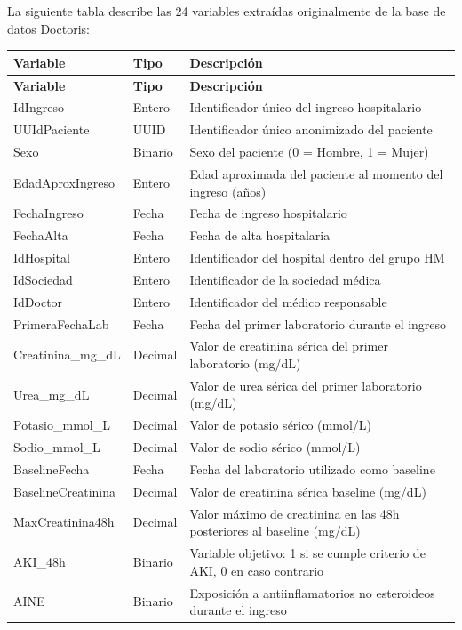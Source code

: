 \documentclass[12pt, a4paper, oneside]{report}
\begin{document}
La siguiente tabla describe las 24 variables extraídas originalmente de la base de datos Doctoris:

\begin{longtable}{p{4cm}p{2.5cm}p{7cm}}
\hline
\textbf{Variable} & \textbf{Tipo} & \textbf{Descripción} \\
\hline
\endfirsthead
\hline
\textbf{Variable} & \textbf{Tipo} & \textbf{Descripción} \\
\hline
\endhead
\hline
\endfoot
IdIngreso & Entero & Identificador único del ingreso hospitalario \\
UUIdPaciente & UUID & Identificador único anonimizado del paciente \\
Sexo & Binario & Sexo del paciente (0 = Hombre, 1 = Mujer) \\
EdadAproxIngreso & Entero & Edad aproximada del paciente al momento del ingreso (años) \\
FechaIngreso & Fecha & Fecha de ingreso hospitalario \\
FechaAlta & Fecha & Fecha de alta hospitalaria \\
IdHospital & Entero & Identificador del hospital dentro del grupo HM \\
IdSociedad & Entero & Identificador de la sociedad médica \\
IdDoctor & Entero & Identificador del médico responsable \\
PrimeraFechaLab & Fecha & Fecha del primer laboratorio durante el ingreso \\
Creatinina\_mg\_dL & Decimal & Valor de creatinina sérica del primer laboratorio (mg/dL) \\
Urea\_mg\_dL & Decimal & Valor de urea sérica del primer laboratorio (mg/dL) \\
Potasio\_mmol\_L & Decimal & Valor de potasio sérico (mmol/L) \\
Sodio\_mmol\_L & Decimal & Valor de sodio sérico (mmol/L) \\
BaselineFecha & Fecha & Fecha del laboratorio utilizado como baseline \\
BaselineCreatinina & Decimal & Valor de creatinina sérica baseline (mg/dL) \\
MaxCreatinina48h & Decimal & Valor máximo de creatinina en las 48h posteriores al baseline (mg/dL) \\
AKI\_48h & Binario & Variable objetivo: 1 si se cumple criterio de AKI, 0 en caso contrario \\
AINE & Binario & Exposición a antiinflamatorios no esteroideos durante el ingreso \\

\end{longtable}
\end{document}
